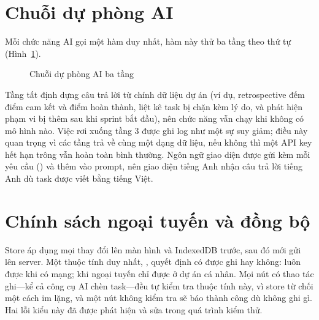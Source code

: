 \documentclass[../main.tex]{subfiles}
\begin{document}
\section{Chuỗi dự phòng AI}
Mỗi chức năng AI gọi một hàm duy nhất, hàm này thử ba tầng theo thứ tự (Hình~\ref{fig:cascade}).

\begin{figure}[H]
\centering
{}
\caption{Chuỗi dự phòng AI ba tầng}\label{fig:cascade}
\end{figure}

Tầng tất định dựng câu trả lời từ chính dữ liệu dự án (ví dụ, retrospective đếm điểm cam kết và điểm
hoàn thành, liệt kê task bị chặn kèm lý do, và phát hiện phạm vi bị thêm sau khi sprint bắt đầu), nên
chức năng vẫn chạy khi không có mô hình nào. Việc rơi xuống tầng 3 được ghi log như một sự suy giảm;
điều này quan trọng vì các tầng trả về cùng một dạng dữ liệu, nếu không thì một API key hết hạn trông
vẫn hoàn toàn bình thường. Ngôn ngữ giao diện được gửi kèm mỗi yêu cầu () và
thêm vào prompt, nên giao diện tiếng Anh nhận câu trả lời tiếng Anh dù task được viết bằng tiếng Việt.

\section{Chính sách ngoại tuyến và đồng bộ}
Store áp dụng mọi thay đổi lên màn hình và IndexedDB trước, sau đó mới gửi lên server. Một thuộc tính
duy nhất, , quyết định có được ghi hay không: luôn được khi có mạng; khi ngoại tuyến
chỉ được ở dự án cá nhân. Mọi nút có thao tác ghi---kể cả công cụ AI chèn task---đều tự kiểm tra
thuộc tính này, vì store từ chối một cách im lặng, và một nút không kiểm tra sẽ báo thành công dù
không ghi gì. Hai lỗi kiểu này đã được phát hiện và sửa trong quá trình kiểm thử.
\end{document}
